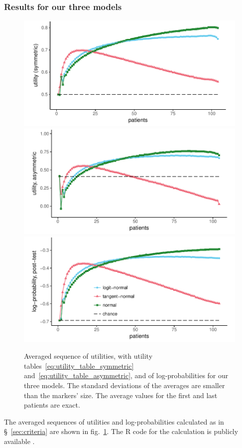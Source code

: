 \documentclass[%
]{frontiersSCNS-nologo} %
\newcommand*{\sect}{\S} %
\newcommand*{\fig}{fig.} %
\renewcommand*{\|}{\mathpunct{|}}%
\begin{document}
\subsubsection{Results for our three models}
\label{sec:results_three_models}
\begin{figure}[!h]
  \centering
\includegraphics[width=0.75\linewidth]{hits-x0_zoom.pdf}
\includegraphics[width=0.75\linewidth]{hits-x2_zoom.pdf}
\includegraphics[width=0.75\linewidth]{expectedsurpriseemp-x2.pdf}
\caption{Averaged sequence of utilities, with utility
  tables~\eqref{eq:utility_table_symmetric}
  and~\eqref{eq:utility_table_asymmetric}, and of log-probabilities for our
  three models. The standard deviations of the averages are smaller than
  the markers' size. The average values for the first and last patients are
  exact.}
\label{fig:utilities}
\end{figure}
The averaged sequences of utilities and log-probabilities calculated as in
\sect~\ref{sec:criteria} are shown in \fig~\ref{fig:utilities}. The R code
for the calculation is publicly available \citep{portamanaetal2018_e2018}.
\end{document}
